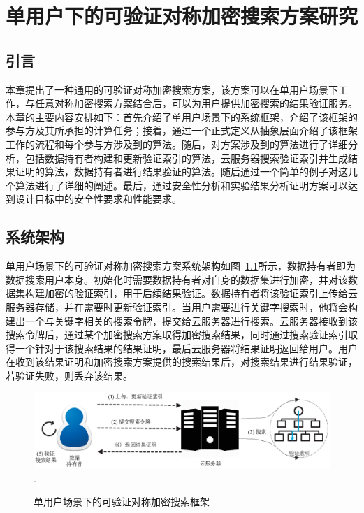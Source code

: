 \chapter{单用户下的可验证对称加密搜索方案研究}
\label{cha:single-user}
\section{引言}
本章提出了一种通用的可验证对称加密搜索方案\single，该方案可以在单用户场景下工作，与任意对称加密搜索方案结合后，可以为用户提供加密搜索的结果验证服务。本章的主要内容安排如下：首先介绍了单用户场景下的系统框架，介绍了该框架的参与方及其所承担的计算任务；接着，通过一个正式定义从抽象层面介绍了该框架工作的流程和每个参与方涉及到的算法。随后，对\single 方案涉及到的算法进行了详细分析，包括数据持有者构建和更新验证索引的算法，云服务器搜索验证索引并生成结果证明的算法，数据持有者进行结果验证的算法。随后通过一个简单的例子对这几个算法进行了详细的阐述。最后，通过安全性分析和实验结果分析证明\single 方案可以达到设计目标中的安全性要求和性能要求。

\section{系统架构}
单用户场景下的可验证对称加密搜索方案系统架构如图~\ref{fig:GS-VSSE}所示，数据持有者即为数据搜索用户本身。初始化时需要数据持有者对自身的数据集进行加密，并对该数据集构建加密的验证索引，用于后续结果验证。数据持有者将该验证索引上传给云服务器存储，并在需要时更新验证索引。当用户需要进行关键字搜索时，他将会构建出一个与关键字相关的搜索令牌，提交给云服务器进行搜索。云服务器接收到该搜索令牌后，通过某个加密搜索方案取得加密搜索结果，同时通过搜索验证索引取得一个针对于该搜索结果的结果证明，最后云服务器将结果证明返回给用户。用户在收到该结果证明和加密搜索方案提供的搜索结果后，对搜索结果进行结果验证，若验证失败，则丢弃该结果。
\begin{figure}[t]
\centering
\includegraphics[width=6 in]{fig/GS-VSSE}
\DeclareGraphicsExtensions.
\caption{单用户场景下的可验证对称加密搜索框架\single}
\label{fig:GS-VSSE}
\end{figure}


